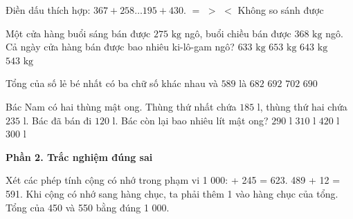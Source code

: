 \begin{ex} %
Điền dấu thích hợp: $367 + 258 \dots 195 + 430$.
\choice
{\True $=$}
{$>$}
{$<$}
{Không so sánh được}
\end{ex}

\begin{ex} %
Một cửa hàng buổi sáng bán được $275\text{ kg}$ ngô, buổi chiều bán được $368\text{ kg}$ ngô. Cả ngày cửa hàng bán được bao nhiêu ki-lô-gam ngô?
\choice
{$633\text{ kg}$}
{$653\text{ kg}$}
{\True $643\text{ kg}$}
{$543\text{ kg}$}
\end{ex}

\begin{ex} %
Tổng của số lẻ bé nhất có ba chữ số khác nhau và $589$ là
\choice
{$682$}
{\True $692$}
{$702$}
{$690$}
\end{ex}

\begin{ex} %
Bác Nam có hai thùng mật ong. Thùng thứ nhất chứa $185\text{ l}$, thùng thứ hai chứa $235\text{ l}$. Bác đã bán đi $120\text{ l}$. Bác còn lại bao nhiêu lít mật ong?
\choice
{$290\text{ l}$}
{$310\text{ l}$}
{$420\text{ l}$}
{\True $300\text{ l}$}
\end{ex}

\textbf{Phần 2. Trắc nghiệm đúng sai}

\begin{ex} %
Xét các phép tính cộng có nhớ trong phạm vi 1 000:
\choiceTF
{ + 245 = 623.}
{489 + 12 = 591.}
{\True Khi cộng có nhớ sang hàng chục, ta phải thêm 1 vào hàng chục của tổng.}
{\True Tổng của 450 và 550 bằng đúng 1 000.}
\end{ex}


